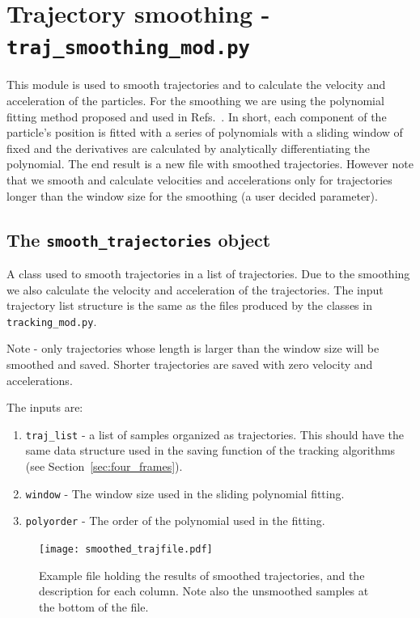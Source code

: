 \documentclass[10pt,a4paper]{article}
\begin{document}
\section{Trajectory smoothing - \texttt{traj\_smoothing\_mod.py}}

This module is used to smooth trajectories and to calculate the velocity and acceleration of the particles. For the smoothing we are using the polynomial fitting method proposed and used in Refs.~\cite{Luthi2005, Shnapp2019}. In short, each component of the particle's position is fitted with a series of polynomials with a sliding window of fixed  and the derivatives are calculated by analytically differentiating the polynomial. The end result is a new file with smoothed trajectories. However note that we smooth and calculate velocities and accelerations only for trajectories longer than the window size for the smoothing (a user decided parameter). 


\subsection{The \texttt{smooth\_trajectories} object}

A class used to smooth trajectories in a list of trajectories. Due to the smoothing we also calculate the velocity and acceleration of the trajectories. The input trajectory list structure is the same as the files produced by the classes in \texttt{tracking\_mod.py}.

Note - only trajectories whose length is larger than the window size will be smoothed and saved. Shorter trajectories are saved with zero velocity and accelerations.


The inputs are:
\begin{enumerate}
	\item \texttt{traj\_list} -  a list of samples organized as trajectories. This should have the same data structure used in the saving function of the tracking algorithms (see Section~\ref{sec:four_frames}). 
	\item \texttt{window} - The window size used in the sliding polynomial fitting.
	\item \texttt{polyorder} - The order of the polynomial used in the fitting. 
\end{enumerate}

\begin{figure}[!ht]
	\centering
	\texttt{[image: smoothed\_trajfile.pdf]}
	\caption{Example file holding the results of smoothed trajectories, and the description for each column. Note also the unsmoothed samples at the bottom of the file. \label{fig:smoothedfile}}
\end{figure}
\end{document}
